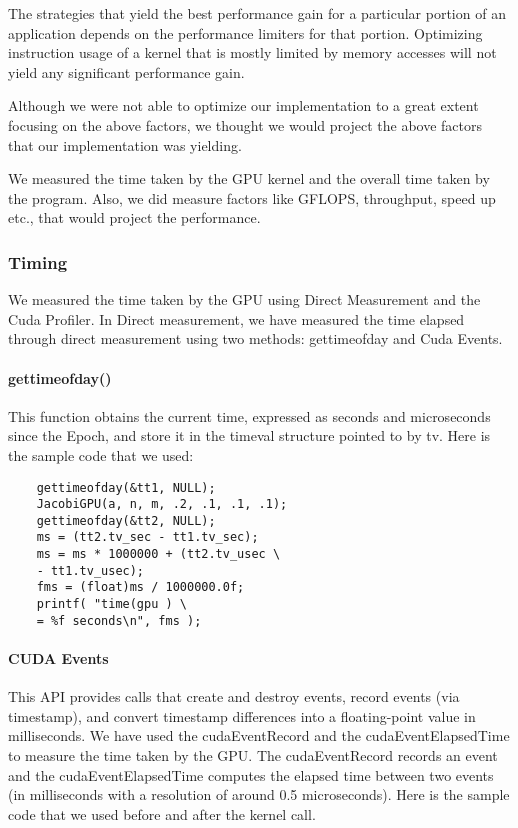 \documentclass[10pt]{article}
\begin{document}
\begin{multicols}{2}
  The strategies that yield the best performance gain for a particular portion of an application depends on the performance limiters for that portion.
  Optimizing instruction usage of a kernel that is mostly limited by memory accesses will not yield any significant performance gain. 

  Although we were not able to optimize our implementation to a great extent focusing on the above factors, we thought we would project the above factors that our implementation was yielding.

  We measured the time taken by the GPU kernel and the overall time taken by the program.
  Also, we did measure factors like GFLOPS, throughput, speed up etc., that would project the performance. 

  \subsubsection{Timing}

  We measured the time taken by the GPU using Direct Measurement and the Cuda Profiler.
  In Direct measurement, we have measured the time elapsed through direct measurement using two methods: gettimeofday and Cuda Events.

  \paragraph{gettimeofday()}
  This function obtains the current time, expressed as seconds and microseconds since the Epoch, and store it in the timeval structure pointed to by tv.
  Here is the sample code that we used:

  \begin{verbatim}
    gettimeofday(&tt1, NULL);
    JacobiGPU(a, n, m, .2, .1, .1, .1);
    gettimeofday(&tt2, NULL);
    ms = (tt2.tv_sec - tt1.tv_sec);
    ms = ms * 1000000 + (tt2.tv_usec \
    - tt1.tv_usec);
    fms = (float)ms / 1000000.0f;
    printf( "time(gpu ) \
    = %f seconds\n", fms );
  \end{verbatim}

  \paragraph{CUDA Events}
  This API provides calls that create and destroy events, record events (via timestamp), and convert timestamp differences into a floating-point value in milliseconds.
  We have used the cudaEventRecord and the cudaEventElapsedTime to  measure the time taken by the GPU.
  The cudaEventRecord records an event and the cudaEventElapsedTime  computes the elapsed time between two events (in milliseconds with a resolution of around 0.5 microseconds).
  Here is the sample code that we used before and after the kernel call. 


\end{multicols}
\end{document}
